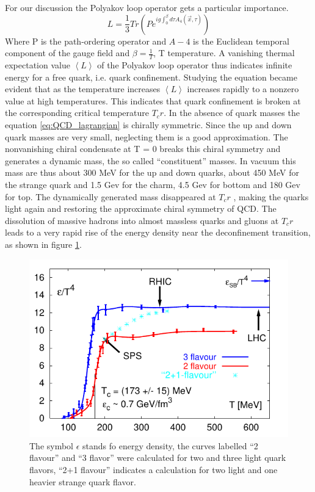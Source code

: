 \documentclass[12pt,a4paper]{book}
\begin{document}
	
	
	For our discussion the Polyakov loop operator gets a particular importance. 
	\begin{equation}
		L=\frac{1}{3} Tr \left(P e^{ig \int_{0}^{\beta} d\tau A_4(\vec{x},\tau) } \right)
		\label{eq:Polyakov-loop}
	\end{equation}
	Where P is the path-ordering operator and $A-4$ is the Euclidean temporal component of the gauge field and $\beta= \frac{1}{T}$, T temperature. A vanishing thermal expectation value $\left<L\right>$ of the Polyakov loop operator thus indicates infinite energy for a free quark, i.e. quark confinement. Studying the equation became evident that as the temperature increases $\left<L\right>$ increases rapidly to a nonzero value at high temperatures. This indicates that quark confinement is broken at the corresponding critical temperature $T_cr$. In the absence of quark	masses the equation \ref{eq:QCD_lagrangian} is chirally symmetric. Since the up and down quark masses are very small, neglecting them is a good approximation. The nonvanishing chiral condensate at T = 0 breaks this chiral symmetry and generates a dynamic mass, the so called “constituent” masses. In vacuum this mass are thus about 300 MeV for the up and down quarks, about 450 MeV for the strange quark and 1.5 Gev for the charm, 4.5 Gev for bottom and 180 Gev for top. The dynamically generated mass disappeared at $T_cr$ , making the quarks light again and restoring the approximate chiral symmetry of QCD. The dissolution of massive hadrons into almost massless quarks and gluons at $T_cr$ leads to a very rapid rise of the energy density near the deconfinement transition, as shown in figure \ref{fig:deconfinement}.
	\begin{figure}[ht]
		\centering
		\includegraphics[width=0.7\linewidth]{pictures/deconfinement.png}
		\caption{The symbol $\epsilon$ stands fo energy density, the curves labelled “2 flavour” and “3 flavor” were calculated for two and three light quark flavors, “2+1 flavour” indicates a calculation for two light and one heavier strange quark flavor.}
		\label{fig:deconfinement} 
	\end{figure}
\end{document}
